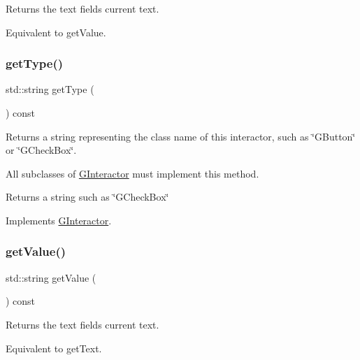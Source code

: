 Returns the text field\textquotesingle{}s current text. 

Equivalent to get\+Value. \mbox{\label{classGTextField_a9896d58fcfebbf1025aeeb5b8b9ede80}} 
\subsubsection{\texorpdfstring{get\+Type()}{getType()}}
{\footnotesize\ttfamily std\+::string get\+Type (\begin{DoxyParamCaption}{ }\end{DoxyParamCaption}) const\hspace{0.3cm}{\ttfamily [virtual]}}



Returns a string representing the class name of this interactor, such as \char`\"{}\+G\+Button\char`\"{} or \char`\"{}\+G\+Check\+Box\char`\"{}. 

All subclasses of \mbox{\hyperlink{classGInteractor}{G\+Interactor}} must implement this method. \begin{DoxyReturn}{Returns}
a string such as \char`\"{}\+G\+Check\+Box\char`\"{} 
\end{DoxyReturn}


Implements \mbox{\hyperlink{classGInteractor_a799e073a127b428cc841086d42ea4fed}{G\+Interactor}}.

\mbox{\label{classGTextField_a2a03038d2e299f486e55dc72778f7086}} 
\subsubsection{\texorpdfstring{get\+Value()}{getValue()}}
{\footnotesize\ttfamily std\+::string get\+Value (\begin{DoxyParamCaption}{ }\end{DoxyParamCaption}) const\hspace{0.3cm}{\ttfamily [virtual]}}



Returns the text field\textquotesingle{}s current text. 

Equivalent to get\+Text. \mbox{\label{classGTextField_a8190c918ce29007223898c9d511b17ee}} 
